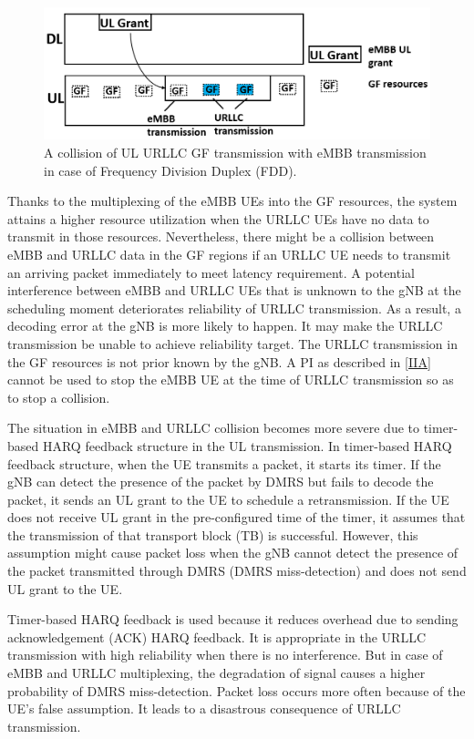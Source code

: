 \documentclass{ieeeaccess}
\begin{document}
\begin{figure}[htbp]
\centerline{\includegraphics[scale=0.28]{fig1.PNG}}
\caption{A collision of UL URLLC GF transmission with eMBB transmission in case of Frequency Division Duplex (FDD).}
\label{fig1}
\end{figure}

Thanks to the multiplexing of the eMBB UEs into the GF resources, the system attains a higher resource utilization when the URLLC UEs have no data to transmit in those resources. Nevertheless, there might be a collision between eMBB and URLLC data in the GF regions if an URLLC UE needs to transmit an arriving packet immediately to meet latency requirement. A potential interference between eMBB and URLLC UEs that is unknown to the gNB at the scheduling moment deteriorates reliability of URLLC transmission. As a result, a decoding error at the gNB is more likely to happen. It may make the URLLC transmission be unable to achieve reliability target. The URLLC transmission in the GF resources is not prior known by the gNB. A PI as described in \ref{IIA} cannot be used to stop the eMBB UE at the time of URLLC transmission so as to stop a collision.

The situation in eMBB and URLLC collision becomes more severe due to timer-based HARQ feedback structure in the UL transmission. In timer-based HARQ feedback structure, when the UE transmits a packet, it starts its timer. If the gNB can detect the presence of the packet by DMRS but fails to decode the packet, it sends an UL grant to the UE to schedule a retransmission. If the UE does not receive UL grant in the pre-configured time of the timer, it assumes that the transmission of that transport block (TB) is successful. However, this assumption might cause packet loss when the gNB cannot detect the presence of the packet transmitted through DMRS (DMRS miss-detection) and does not send UL grant to the UE. 

Timer-based HARQ feedback is used because it reduces overhead due to sending acknowledgement (ACK) HARQ feedback. It is appropriate in the URLLC transmission with high reliability when there is no interference. But in case of eMBB and URLLC multiplexing, the degradation of signal causes a higher probability of DMRS miss-detection. Packet loss occurs more often because of the UE's false assumption. It leads to a disastrous consequence of URLLC transmission.
\end{document}
